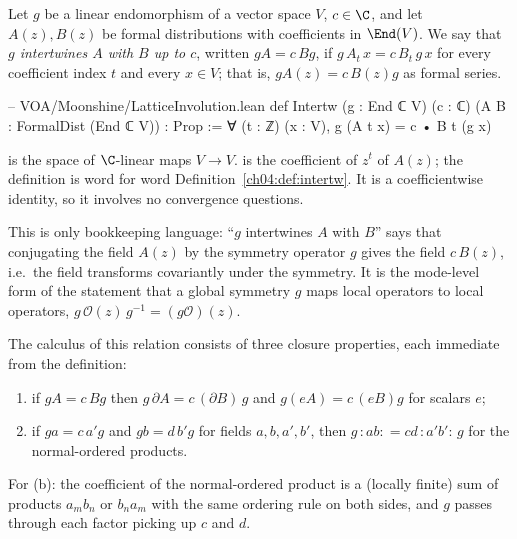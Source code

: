 \begin{definition}\label{ch04:def:intertw}
Let $g$ be a linear endomorphism of a vector space $V$, $c\in\C$, and let $A(z),B(z)$ be formal
distributions with coefficients in $\End(V)$. We say that \emph{$g$ intertwines $A$ with $B$ up
to $c$}, written $gA=c\,Bg$, if $g\,A_t\,x=c\,B_t\,g\,x$ for every coefficient index $t$ and every
$x\in V$; that is, $gA(z)=c\,B(z)g$ as formal series.
\end{definition}

\begin{leancode}
-- VOA/Moonshine/LatticeInvolution.lean
def Intertw (g : End ℂ V) (c : ℂ) (A B : FormalDist (End ℂ V)) : Prop :=
  ∀ (t : ℤ) (x : V), g (A t x) = c • B t (g x)
\end{leancode}

\begin{dictionary}
 is the space of $\C$-linear maps $V\to V$.  is the coefficient of $z^t$
of $A(z)$; the definition is word for word Definition~\ref{ch04:def:intertw}. It is a
coefficientwise identity, so it involves no convergence questions.
\end{dictionary}

\begin{physics}
This is only bookkeeping language: ``$g$ intertwines $A$ with $B$'' says that conjugating the field $A(z)$ by the symmetry operator $g$ gives the field $c\,B(z)$, i.e.\ the field transforms covariantly under the symmetry. It is the mode-level form of the statement that a global symmetry $g$ maps local operators to local operators, $g\,\mathcal O(z)\,g^{-1}=(g\mathcal O)(z)$.
\end{physics}

The calculus of this relation consists of three closure properties, each immediate from the
definition:
\begin{enumerate}[label=(\alph*)]
\item if $gA=c\,Bg$ then $g\,\partial A=c\,(\partial B)\,g$ and $g(eA)=c\,(eB)g$ for scalars $e$;
\item if $ga=c\,a'g$ and $gb=d\,b'g$ for fields $a,b,a',b'$, then
  $g\,{:}ab{:}=cd\,{:}a'b'{:}\,g$ for the normal-ordered products.
\end{enumerate}
For (b): the coefficient of the normal-ordered product is a (locally finite) sum of products
$a_mb_n$ or $b_na_m$ with the same ordering rule on both sides, and $g$ passes through each factor
picking up $c$ and $d$.

